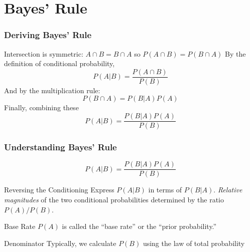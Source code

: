 \documentclass{beamer}
\begin{document}
\section{Bayes' Rule}
\begin{frame}
\frametitle{Deriving Bayes' Rule}
Intersection is symmetric: $A\cap B = B\cap A$ so $P(A\cap B) = P(B \cap A)$ \pause  By the definition of conditional probability,
	$$P(A|B) = \frac{P(A\cap B)}{P(B)}$$ \pause
And by the multiplication rule:
	$$P(B\cap A) = P(B|A)P(A)$$ \pause
Finally, combining these
	$$P(A|B) = \frac{P(B|A)P(A)}{P(B)}$$
\end{frame}
\begin{frame}
\frametitle{Understanding Bayes' Rule}
$$\boxed{P(A|B) = \frac{P(B|A)P(A)}{P(B)}}$$

\begin{block}
	{Reversing the Conditioning}
	Express $P(A|B)$ in terms of $P(B|A)$. \emph{Relative magnitudes} of the two conditional probabilities determined by the ratio $P(A)/P(B)$.
\end{block}

\begin{block}
	{Base Rate}
	$P(A)$ is called the ``base rate'' or the ``prior probability.'' 
\end{block}

\begin{block}
	{Denominator}
	Typically, we calculate $P(B)$ using the law of total probability
\end{block}


\end{frame}
\end{document}
